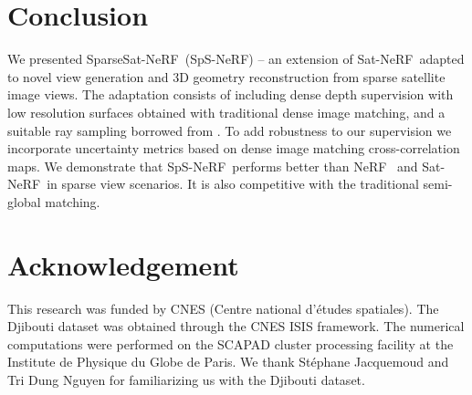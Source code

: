 \documentclass{isprs} %
\newcommand{\Nerf}{{NeRF}}
\newcommand{\OurNeRF}{{SparseSat-NeRF}}
\newcommand{\OurNeRFShort}{{SpS-NeRF}}
\begin{document}
\section{Conclusion}
We presented \OurNeRF~(\OurNeRFShort) -- an extension of Sat-\Nerf~adapted to novel view generation and 3D geometry reconstruction from sparse satellite image views. The adaptation consists of including dense depth supervision with low resolution surfaces obtained with traditional dense image matching, and a suitable ray sampling borrowed from \cite{roessle2022dense}. To add robustness to our supervision we incorporate uncertainty metrics based on dense image matching cross-correlation maps. We demonstrate that \OurNeRFShort~performs better than \Nerf~ and Sat-\Nerf~in sparse view scenarios. It is also competitive with the traditional semi-global matching.


\section{Acknowledgement}
This research was funded by CNES (Centre national d'études spatiales). The Djibouti dataset was obtained through the CNES ISIS framework. The numerical computations were performed on the SCAPAD cluster processing facility at the Institute de Physique du Globe de Paris. We thank Stéphane Jacquemoud and Tri Dung Nguyen for familiarizing us with the Djibouti dataset.

 
\footnotesize

\end{document}
